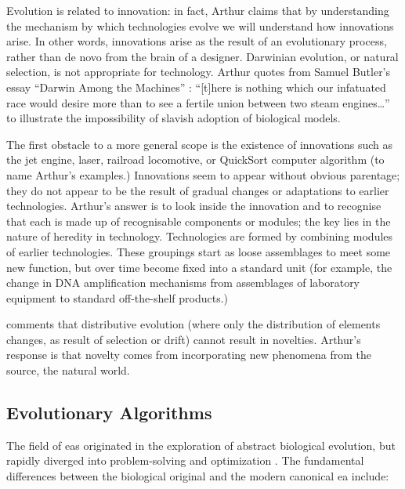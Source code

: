 Evolution is related to innovation: in fact, Arthur claims that by understanding the mechanism by which technologies evolve we will understand how innovations arise. In other words, innovations arise as the result of an evolutionary process, rather than de novo from the brain of a designer. Darwinian evolution, or natural selection, is not appropriate for technology. Arthur quotes from Samuel Butler's essay ``Darwin Among the Machines'' : ``{[}t{]}here is nothing which our infatuated race would desire more than to see a fertile union between two steam engines\ldots{}'' to illustrate the impossibility of slavish adoption of biological models.

The first obstacle to a more general scope is the existence of innovations such as the jet engine, laser, railroad locomotive, or QuickSort computer algorithm (to name Arthur's examples.) Innovations seem to appear without obvious parentage; they do not appear to be the result of gradual changes or adaptations to earlier technologies. Arthur's answer is to look inside the innovation and to recognise that each is made up of recognisable components or modules; the key lies in the nature of heredity in technology. Technologies are formed by combining modules of earlier technologies. These groupings start as loose assemblages to meet some new function, but over time become fixed into a standard unit (for example, the change in DNA amplification mechanisms from assemblages of laboratory equipment to standard off-the-shelf products.)

\parencite{Bourrat2015} comments that distributive evolution (where only the distribution of elements changes, as result of selection or drift) cannot result in novelties. Arthur's response is that novelty comes from incorporating new phenomena from the source, the natural world.

\subsection{Evolutionary Algorithms}

The field of \glspl{ea} originated in the exploration of abstract biological evolution, but rapidly diverged into problem-solving and optimization \cite{De-Jong:1993gy,DeJong2006}. The fundamental differences between the biological original and the modern canonical \gls{ea} include:

